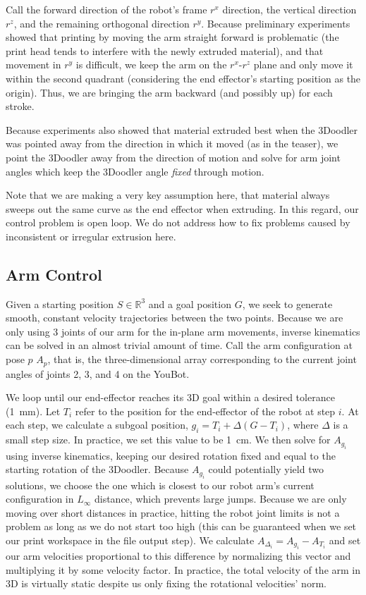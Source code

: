 \documentclass[conference]{acmsiggraph}
\begin{document}
Call the forward direction of the robot's frame $r^x$ direction, the vertical direction $r^z$, and the remaining orthogonal direction $r^y$.  Because preliminary experiments showed that printing by moving the arm straight forward is problematic (the print head tends to interfere with the newly extruded material), and that movement in $r^y$ is difficult, we keep the arm on the $r^x$-$r^z$ plane and only move it within the second quadrant (considering the end effector's starting position as the origin).  Thus, we are bringing the arm backward (and possibly up) for each stroke.

Because experiments also showed that material extruded best when the 3Doodler was pointed away from the direction in which it moved (as in the teaser), we point the 3Doodler away from the direction of motion and solve for arm joint angles which keep the 3Doodler angle \emph{fixed} through motion.

Note that we are making a very key assumption here, that material always sweeps out the same curve as the end effector when extruding.  In this regard, our control problem is open loop.  We do not address how to fix problems caused by inconsistent or irregular extrusion here.

\subsection{Arm Control}
Given a starting position $S \in \mathbb{R}^3$ and a goal position $G$, we seek to generate smooth, constant velocity trajectories between the two points.  Because we are only using 3 joints of our arm for the in-plane arm movements, inverse kinematics can be solved in an almost trivial amount of time.  Call the arm configuration at pose $p$ $A_p$, that is, the three-dimensional array corresponding to the current joint angles of joints 2, 3, and 4 on the YouBot.

We loop until our end-effector reaches its 3D goal within a desired tolerance (1~mm).  Let $T_i$ refer to the position for the end-effector of the robot at step $i$.  At each step, we calculate a subgoal position, $g_i = T_i + \Delta(G - T_i)$, where $\Delta$ is a small step size.  In practice, we set this value to be 1~cm.  We then solve for $A_{g_i}$ using inverse kinematics, keeping our desired rotation fixed and equal to the starting rotation of the 3Doodler.  Because $A_{g_i}$ could potentially yield two solutions, we choose the one which is closest to our robot arm's current configuration in $L_{\infty}$ distance, which prevents large jumps.  Because we are only moving over short distances in practice, hitting the robot joint limits is not a problem as long as we do not start too high (this can be guaranteed when we set our print workspace in the file output step).  We calculate $A_{\Delta_i} = A_{g_i} - A_{T_i}$ and set our arm velocities proportional to this difference by normalizing this vector and multiplying it by some velocity factor.  In practice, the total velocity of the arm in 3D is virtually static despite us only fixing the rotational velocities' norm.
\end{document}
